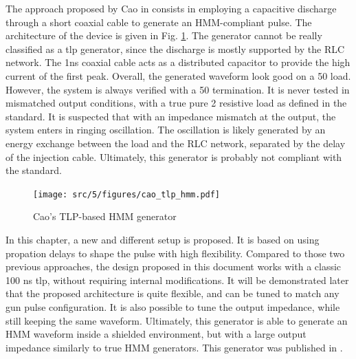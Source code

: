 The approach proposed by Cao in \cite{tlp-based-hmm} consists in employing a capacitive discharge through a short coaxial cable to generate an HMM-compliant pulse.
The architecture of the device is given in Fig. \ref{fig:cao_tlp_hmm}.
The generator cannot be really classified as a \gls{tlp} generator, since the discharge is mostly supported by the RLC network. The 1ns coaxial cable acts as a distributed capacitor to provide the high current of the first peak.
Overall, the generated waveform look good on a 50\textOmega{} load.
However, the system is always verified with a 50\textOmegae{} termination.
It is never tested in mismatched output conditions, with a true pure 2\textOmega{} resistive load as defined in the standard.
It is suspected that with an impedance mismatch at the output, the system enters in ringing oscillation.
The oscillation is likely generated by an energy exchange between the load and the RLC network, separated by the delay of the injection cable.
Ultimately, this generator is probably not compliant with the standard.

\begin{figure}[!h]
  \centering
  \texttt{[image: src/5/figures/cao\_tlp\_hmm.pdf]}
  \caption{Cao's TLP-based HMM generator}
  \label{fig:cao_tlp_hmm}
\end{figure}

In this chapter, a new and different setup is proposed.
It is based on using propation delays to shape the pulse with high flexibility.
Compared to those two previous approaches, the design proposed in this document works with a classic 100 ns \gls{tlp}, without requiring internal modifications.
It will be demonstrated later that the proposed architecture is quite flexible, and can be tuned to match any gun pulse configuration.
It is also possible to tune the output impedance, while still keeping the same waveform.
Ultimately, this generator is able to generate an HMM waveform inside a shielded environment, but with a large output impedance similarly to true HMM generators.
This generator was published in \cite{my-publi-tlp-hmm}.
